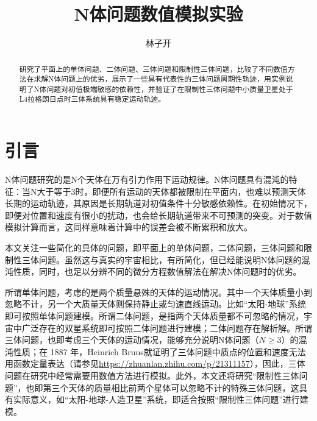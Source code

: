 \documentclass{article}
\title{N体问题数值模拟实验}
\author{林子开}
\begin{document}
	\maketitle
	
	\begin{abstract}
		研究了平面上的单体问题、二体问题、三体问题和限制性三体问题，比较了不同数值方法在求解N体问题上的优劣，展示了一些具有代表性的三体问题周期性轨迹，用实例说明了N体问题对初值极端敏感的依赖性，并验证了在限制性三体问题中小质量卫星处于L4拉格朗日点时三体系统具有稳定运动轨迹。
	\end{abstract}
	\tableofcontents
	\section{引言}
	
%	
\par N体问题研究的是N个天体在万有引力作用下运动规律。N体问题具有混沌的特征：当N大于等于3时，即便所有运动的天体都被限制在平面内，也难以预测天体长期的运动轨迹，其原因是长期轨道对初值条件十分敏感依赖性\cite{sauer2018数值分析}。在初始情况下，即便对位置和速度有很小的扰动，也会给长期轨道带来不可预测的突变。对于数值模拟计算而言，这同样意味着计算中的误差会被不断累积和放大。
\par 本文关注一些简化的具体的问题，即平面上的单体问题，二体问题，三体问题和限制性三体问题。虽然这与真实的宇宙相比，有所简化，但已经能说明N体问题的混沌性质，同时，也足以分辨不同的微分方程数值解法在解决N体问题时的优劣。
\par 所谓单体问题，考虑的是两个质量悬殊的天体的运动情况。其中一个天体质量小到忽略不计，另一个大质量天体则保持静止或匀速直线运动。比如“太阳-地球”系统即可按照单体问题建模。所谓二体问题，是指两个天体质量都不可忽略的情况，宇宙中广泛存在的双星系统即可按照二体问题进行建模；二体问题存在解析解。所谓三体问题，也即考虑三个天体的运动情况，能够充分说明N体问题（$N \ge 3$）的混沌性质；在 1887 年，Heinrich Bruns就证明了三体问题中质点的位置和速度无法用函数定量表达（请参见\url{https://zhuanlan.zhihu.com/p/21311157}），因此，三体问题在研究中经常需要用数值方法进行模拟。此外，本文还将研究“限制性三体问题”，也即第三个天体的质量相比前两个星体可以忽略不计的特殊三体问题，这具有实际意义，如“太阳-地球-人造卫星”系统，即适合按照“限制性三体问题”进行建模。
\end{document}
